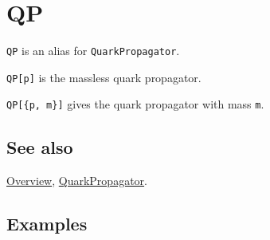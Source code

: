 \documentclass[../FeynCalcManual.tex]{subfiles}
\begin{document}
\hypertarget{qp}{
\section{QP}\label{qp}}

\texttt{QP} is an alias for \texttt{QuarkPropagator}.

\texttt{QP[\allowbreak{}p]} is the massless quark propagator.

\texttt{QP[\allowbreak{}\{\allowbreak{}p,\ \allowbreak{}m\}]} gives the
quark propagator with mass \texttt{m}.

\subsection{See also}

\hyperlink{toc}{Overview}, \hyperlink{quarkpropagator}{QuarkPropagator}.

\subsection{Examples}
\end{document}
